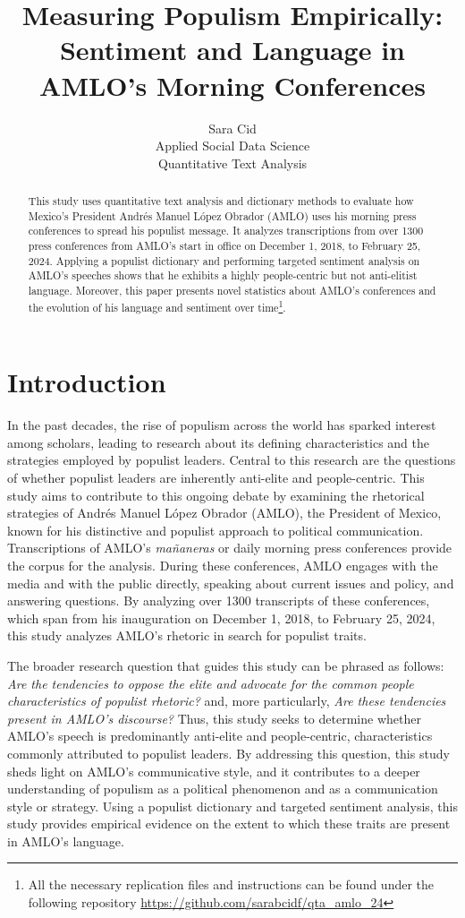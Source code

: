 \documentclass[]{article}
\title{Measuring Populism Empirically: Sentiment and Language in AMLO's Morning Conferences}
\author{Sara Cid \\  Applied Social Data Science \\  Quantitative Text Analysis}
\begin{document}
\maketitle

\begin{abstract}
	
	This study uses quantitative text analysis and dictionary methods to evaluate how Mexico's President Andrés Manuel López Obrador (AMLO) uses his morning press conferences to spread his populist message. It analyzes transcriptions from over 1300 press conferences from AMLO's start in office on December 1, 2018, to February 25, 2024. Applying a populist dictionary and performing targeted sentiment analysis on AMLO's speeches shows that he exhibits a highly people-centric but not anti-elitist language. Moreover, this paper presents novel statistics about AMLO's conferences and the evolution of his language and sentiment over time\footnote{All the necessary replication files and instructions can be found under the following repository \url{https://github.com/sarabcidf/qta_amlo_24}}.

\end{abstract}

\section{Introduction} 

In the past decades, the rise of populism across the world has sparked interest among scholars, leading to research about its defining characteristics and the strategies employed by populist leaders. Central to this research are the questions of whether populist leaders are inherently anti-elite and people-centric. This study aims to contribute to this ongoing debate by examining the rhetorical strategies of Andrés Manuel López Obrador (AMLO), the President of Mexico, known for his distinctive and populist approach to political communication. Transcriptions of AMLO's \textit{mañaneras} or daily morning press conferences provide the corpus for the analysis. During these conferences, AMLO engages with the media and with the public directly, speaking about current issues and policy, and answering questions. By analyzing over 1300 transcripts of these conferences, which span from his inauguration on December 1, 2018, to February 25, 2024, this study analyzes AMLO's rhetoric in search for populist traits.  

The broader research question that guides this study can be phrased as follows: \textit{Are the tendencies to oppose the elite and advocate for the common people characteristics of populist rhetoric?} and, more particularly, \textit{Are these tendencies present in AMLO's discourse?} Thus, this study seeks to determine whether AMLO's speech is predominantly anti-elite and people-centric, characteristics commonly attributed to populist leaders. By addressing this question, this study sheds light on AMLO's communicative style, and it contributes to a deeper understanding of populism as a political phenomenon and as a communication style or strategy. Using a populist dictionary and targeted sentiment analysis, this study provides empirical evidence on the extent to which these traits are present in AMLO's language. 
\end{document}

